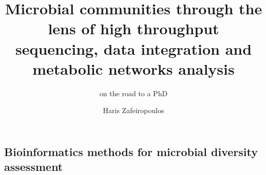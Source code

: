 \documentclass{beamer}
\title{Microbial communities through the lens of high throughput sequencing, data integration and metabolic networks analysis }
\subtitle{on the road to a PhD}
\author{Haris Zafeiropoulos}
\begin{document}
   \shorthandoff{-}
   \frame[c]{
      \maketitle
   }

   

   \begin{darkframes}
      \section{
         Bioinformatics methods for microbial diversity assessment
      }
   
   \end{darkframes}

\end{document}
